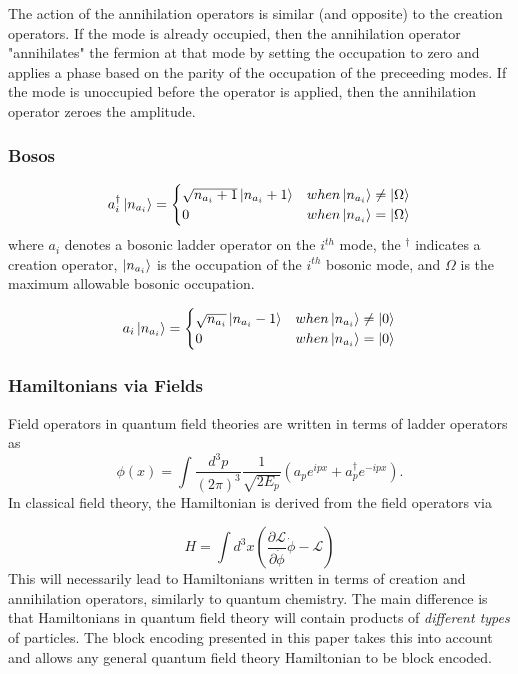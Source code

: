The action of the annihilation operators is similar (and opposite) to the creation operators.
If the mode is already occupied, then the annihilation operator "annihilates" the fermion at that mode by setting the occupation to zero and applies a phase based on the parity of the occupation of the preceeding modes.
If the mode is unoccupied before the operator is applied, then the annihilation operator zeroes the amplitude.

\subsubsection{Bosos}

\begin{equation}
    \label{eq:bosonic-creation}
    a_i^\dagger \ket{n_{a_i}} = 
    \begin{cases} 
        \sqrt{n_{a_i} + 1} \ket{n_{a_i} + 1}  & when \ket{n_{a_i}} \neq \ket{\Omega} \\
        0 & when \ket{n_{a_i}} = \ket{\Omega}
    \end{cases}
\end{equation}
where $a_i$ denotes a bosonic ladder operator on the $i^{th}$ mode, the $^\dagger$ indicates a creation operator, $\ket{n_{a_i}}$ is the occupation of the $i^{th}$ bosonic mode, and $\Omega$ is the maximum allowable bosonic occupation.

\begin{equation}
    \label{eq:bosonic-annihilation}
    a_i \ket{n_{a_i}} = 
    \begin{cases} 
        \sqrt{n_{a_i}} \ket{n_{a_i} - 1}  & when \ket{n_{a_i}} \neq \ket{0} \\
        0 & when \ket{n_{a_i}} = \ket{0}
    \end{cases}
\end{equation}

\subsubsection{Hamiltonians via Fields}
Field operators in quantum field theories are written in terms of ladder operators as
\begin{equation}
    \phi(x) = \int \frac{d^3p}{(2\pi)^3}\frac{1}{\sqrt{2E_p}}\left(a_p e^{ipx} + a_p^\dagger e^{-ipx}\right).
\end{equation}
In classical field theory, the Hamiltonian is derived from the field operators via 

\begin{equation}
    H = \int d^3x \left(\frac{\partial \mathcal{L}}{\partial \dot{\phi}}\dot{\phi} - \mathcal{L} \right)
\end{equation}
This will necessarily lead to Hamiltonians written in terms of creation and annihilation operators, similarly to quantum chemistry. The main difference is that 
Hamiltonians in quantum field theory will contain products of \emph{different types} of particles. The block encoding presented in this paper takes this into account and allows any general quantum field theory Hamiltonian to be block encoded. 

